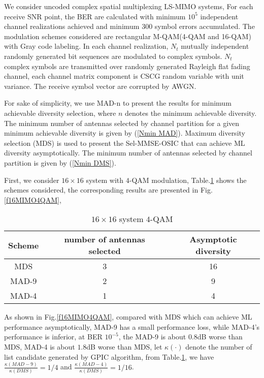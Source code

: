 \documentclass[12pt, draftclsnofoot, onecolumn]{IEEEtran}
\begin{document}
We consider uncoded complex spatial multiplexing LS-MIMO systems, For each receive SNR point, the BER are calculated with minimum $10^{5}$ independent channel realizations achieved and minimum 300 symbol errors accumulated. The modulation schemes considered are rectangular M-QAM(4-QAM and 16-QAM) with Gray code labeling. In each channel realization, $N_{t}$ mutually independent randomly generated bit sequences are modulated to complex symbols. $N_{t}$ complex symbols are transmitted over randomly generated Rayleigh flat fading channel, each channel matrix component is CSCG random variable with unit variance. The receive symbol vector are corrupted by AWGN.

For sake of simplicity, we use MAD-n to present the results for minimum achievable diversity selection, where $n$ denotes the minimum achievable diversity. The minimum number of antennas selected by channel partition for a given minimum achievable diversity is given by (\ref{Nmin MAD}). Maximum diversity selection (MDS) is used to present the Sel-MMSE-OSIC that can achieve ML diversity asymptotically. The minimum number of antennas selected by channel partition is given by (\ref{Nmin DMS}).

First, we consider $16\times 16$ system with $4$-QAM modulation, Table.\ref{t16MIMO4QAM} shows the schemes considered, the corresponding results are presented in Fig.\ref{f16MIMO4QAM}, 
\begin{table}[htb]
\renewcommand{\arraystretch}{1.3}
\caption{$16\times 16$ system $4$-QAM}
\label{t16MIMO4QAM}
\centering
\begin{tabular}{|c|c|c|}
\hline
Scheme&number of antennas selected&Asymptotic diversity\\
\hline 
MDS&3&16\\
\hline
MAD-9&2&9\\
\hline
MAD-4&1&4\\
\hline
\end{tabular}
\end{table}

As shown in Fig.\ref{f16MIMO4QAM}, compared with MDS which can achieve ML performance asymptotically, MAD-9 has a small performance loss, while MAD-4's performance is inferior, at BER $10^{-5}$, the MAD-9 is about $0.8$dB worse than MDS, MAD-4 is about $1.8$dB worse than MDS, let $\kappa(\cdot)$ denote the number of list candidate generated by GPIC algorithm\cite{radji2009interference}, from Table.\ref{t16MIMO4QAM}, 
we have $\frac{\kappa(MAD-9)}{\kappa(DMS)}=1/4$ and $\frac{\kappa(MAD-4)}{\kappa(DMS)}=1/16$.
\end{document}
